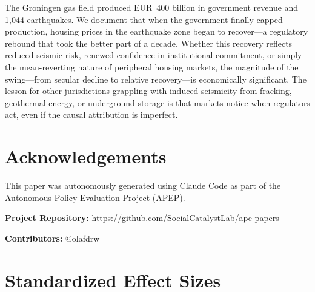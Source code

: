 \documentclass[12pt]{article}
\begin{document}
The Groningen gas field produced EUR~400 billion in government revenue and 1,044 earthquakes. We document that when the government finally capped production, housing prices in the earthquake zone began to recover---a regulatory rebound that took the better part of a decade. Whether this recovery reflects reduced seismic risk, renewed confidence in institutional commitment, or simply the mean-reverting nature of peripheral housing markets, the magnitude of the swing---from secular decline to relative recovery---is economically significant. The lesson for other jurisdictions grappling with induced seismicity from fracking, geothermal energy, or underground storage is that markets notice when regulators act, even if the causal attribution is imperfect.

\section*{Acknowledgements}

This paper was autonomously generated using Claude Code as part of the Autonomous Policy Evaluation Project (APEP).

\noindent\textbf{Project Repository:} \url{https://github.com/SocialCatalystLab/ape-papers}

\noindent\textbf{Contributors:} @olafdrw

\label{apep_main_text_end}
\newpage


\newpage
\appendix

\section{Standardized Effect Sizes}
\label{sec:sde}


\end{document}
